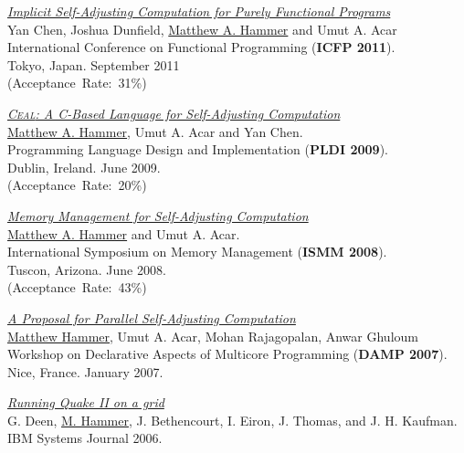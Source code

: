 \documentclass[10pt,letterpaper]{article}
\newcommand{\BeanCounter}[1]{(Acceptance~Rate:~#1\%)}
\renewenvironment{itemize}{
  \begin{list}{}{
    \setlength{\leftmargin}{1.5em}
    \setlength{\itemsep}{0.25em}
    \setlength{\parskip}{0pt}
    \setlength{\parsep}{0.25em}
  }
}{
  \end{list}
}
\begin{document}
\begin{itemize}
\item
\href{http://www.cs.umd.edu/~hammer/icfp11}
{\textit{Implicit Self-Adjusting Computation for Purely Functional Programs}}
\\
Yan Chen, Joshua Dunfield, \underline{Matthew A. Hammer} and Umut A. Acar 
\\
International Conference on Functional Programming (\textbf{ICFP 2011}).
\\
Tokyo, Japan. September 2011
\\
\BeanCounter{31}

\item
\href{http://www.cs.umd.edu/~hammer/pldi09}
{\textit{\textsc{Ceal}: A C-Based Language for Self-Adjusting Computation}}
\\
\underline{Matthew A. Hammer}, Umut A. Acar and Yan Chen.
\\
Programming Language Design and Implementation (\textbf{PLDI 2009}).
\\
Dublin, Ireland. June 2009.
\\
\BeanCounter{20}

\item
\href{http://www.cs.umd.edu/~hammer/ismm08}
{\textit{Memory Management for Self-Adjusting Computation}}
\\
\underline{Matthew A. Hammer} and Umut A. Acar.
\\
International Symposium on Memory Management (\textbf{ISMM 2008}).
\\
Tuscon, Arizona. June 2008.
\\
\BeanCounter{43}

\item
\href{http://www.cs.umd.edu/~hammer/papers/damp07.pdf}
{\textit{A Proposal for Parallel Self-Adjusting Computation}}
\\
\underline{Matthew Hammer}, Umut A. Acar, Mohan Rajagopalan, Anwar Ghuloum
\\
Workshop on Declarative Aspects of Multicore Programming (\textbf{DAMP 2007}).
\\
Nice, France. January 2007.

\item
\href{http://www.cs.umd.edu/~hammer/papers/ibmsj06quake.pdf}
{\textit{Running Quake II on a grid}}
\\
G. Deen, \underline{M. Hammer}, J. Bethencourt, I. Eiron, J. Thomas, and J. H. Kaufman.
\\
IBM Systems Journal 2006.

\end{itemize}
\end{document}
